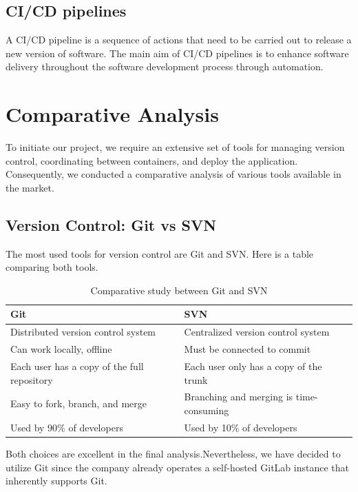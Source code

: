 \subsection{CI/CD pipelines}
A CI/CD pipeline is a sequence of actions that need to be carried out to release a new version of software. The main aim of CI/CD pipelines is to enhance software delivery throughout the software development process through automation.


\section{Comparative Analysis}
To initiate our project, we require an extensive set of tools for managing version control, coordinating between containers, and deploy the application. Consequently, we conducted a comparative analysis of various tools available in the market.

\subsection{Version Control: Git vs SVN}
The most used tools for version control are Git and SVN. Here is a table
comparing both tools.


\begin{table}[h!]
  \centering
  \renewcommand{\arraystretch}{1.5} 
  \caption{Comparative study between Git and SVN}
  \label{tab: comparative_study_between_Git_and_SVN}
  \begin{tabularx}{\textwidth}{|>{\centering\arraybackslash}X|>{\centering\arraybackslash}X|}
      \hline
      \rowcolor{blue!20} 
      \textbf{Git} & \textbf{SVN} \\
      \hline
       Distributed version
control system & Centralized version
control system \\
      \hline
      Can work locally, offline & Must be connected to commit \\
      \hline
      Each user has a copy of the full repository & Each user only has a copy of the trunk  \\
      \hline
      Easy to fork, branch, and merge & Branching and merging is time-consuming  \\
      \hline
      Used by 90\% of developers & Used by 10\% of developers  \\
      \hline
  \end{tabularx}
\end{table}
Both choices are excellent in the final analysis.Nevertheless, we have decided to utilize Git since the company already operates a self-hosted GitLab instance that inherently supports Git.


